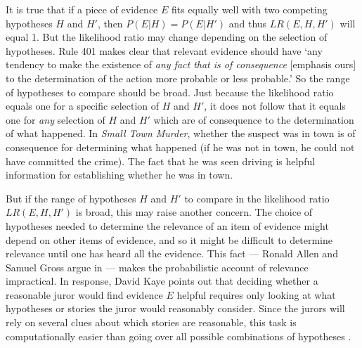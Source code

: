 \documentclass{article}
\begin{document}



It is true that if a piece of evidence $E$ fits equally well with two competing hypotheses  $H$ and $H'$,  then $P(E\vert H)=P(E\vert H')$ and thus $LR(E,H,H')$ will equal 1. But the likelihood ratio may change depending on the selection of hypotheses. Rule 401 makes clear that relevant 
evidence should have `any tendency to make the existence of \emph{any fact that is of consequence} [emphasis ours] to the determination of the action more probable or less probable.' So the range of hypotheses to compare should be broad. Just because the likelihood ratio equals one for a specific selection of $H$ and $H'$, it does not follow that it equals one for \textit{any} selection of $H$ and $H'$ which are of consequence to the determination of what happened.  In \textit{Small Town Murder}, whether the suspect was in town is of consequence for determining what happened  (if he was not in town, he could not have committed the crime). The fact that he was seen driving is helpful information for establishing whether he was in town.  

But if the range of  hypotheses $H$ and $H'$ to compare in the likelihood ratio $LR(E, H, H')$ is broad, 
this may raise another concern. The choice of hypotheses  needed to determine the relevance of an  item of evidence might depend on other items of evidence, and so it might be  difficult to determine relevance until one has heard all the evidence.  This fact --- Ronald Allen and Samuel Gross argue in \citep{park2010BayesWarsRedivivus} ---  makes the probabilistic account of relevance impractical.  In response, David Kaye points out that deciding whether a reasonable juror would find  evidence $E$  helpful requires only looking at what hypotheses or stories the juror would reasonably consider. Since the jurors will rely on several clues about which stories are reasonable, this task is computationally easier than going over all possible combinations of  hypotheses \citep{park2010BayesWarsRedivivus}. 
\end{document}
